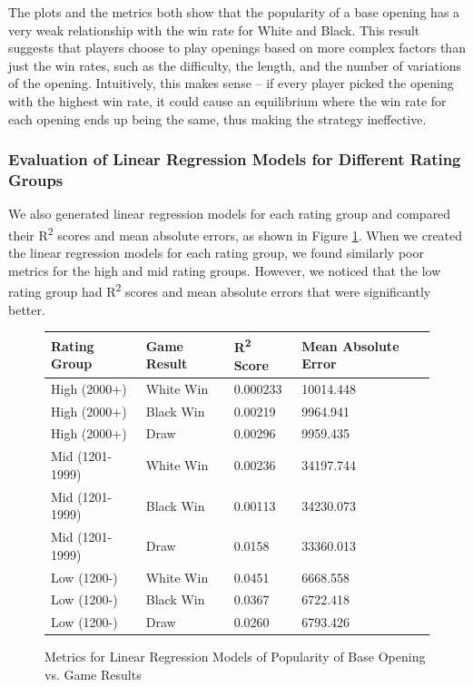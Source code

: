 \documentclass[a4paper, 11pt]{article}
\begin{document}
The plots and the metrics both show that the popularity of a base opening has a very weak relationship with the win rate for White and Black. This result suggests that players choose to play openings based on more complex factors than just the win rates, such as the difficulty, the length, and the number of variations of the opening. Intuitively, this makes sense -- if every player picked the opening with the highest win rate, it could cause an equilibrium where the win rate for each opening ends up being the same, thus making the strategy ineffective.

\subsubsection{Evaluation of Linear Regression Models for Different Rating Groups}
We also generated linear regression models for each rating group and compared their R\textsuperscript{2} scores and mean absolute errors, as shown in Figure \ref{fig:metricsForLinearRegressionModelsOfPopularityOfBaseOpeningVsGameResults}. When we created the linear regression models for each rating group, we found similarly poor metrics for the high and mid rating groups. However, we noticed that the low rating group had R\textsuperscript{2} scores and mean absolute errors that were significantly better.

\begin{figure}[H]
    \centering
    \caption{Metrics for Linear Regression Models of Popularity of Base Opening vs. Game Results}
    \label{fig:metricsForLinearRegressionModelsOfPopularityOfBaseOpeningVsGameResults}
    \begin{tabular}{| l | l | l | l |} 
        \hline
        \bf{Rating Group} & \bf{Game Result} & \bf{R\textsuperscript{2} Score} & \bf{Mean Absolute Error} \\ [0.5ex] 
        \hline
        High (2000+) & White Win & 0.000233 & 10014.448 \\
        \hline
        High (2000+) & Black Win & 0.00219 & 9964.941 \\
        \hline
        High (2000+) & Draw & 0.00296 & 9959.435 \\
        \hline
        Mid (1201-1999) & White Win & 0.00236 & 34197.744 \\
        \hline
        Mid (1201-1999) & Black Win & 0.00113 & 34230.073 \\
        \hline
        Mid (1201-1999) & Draw & 0.0158 & 33360.013 \\
        \hline
        Low (1200-) & White Win & 0.0451 & 6668.558 \\
        \hline
        Low (1200-) & Black Win & 0.0367 & 6722.418 \\
        \hline
        Low (1200-) & Draw & 0.0260 & 6793.426 \\
        \hline
    \end{tabular}
\end{figure}
\end{document}
